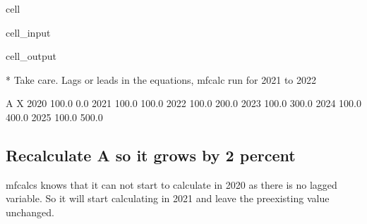 \documentclass[letterpaper,10pt,english]{jupyterBook}
\begin{document}
\begin{sphinxuseclass}{cell}\begin{sphinxVerbatimInput}

\begin{sphinxuseclass}{cell_input}
\begin{sphinxVerbatim}[commandchars=\\\{\}]
 
\end{sphinxVerbatim}

\end{sphinxuseclass}\end{sphinxVerbatimInput}
\begin{sphinxVerbatimOutput}

\begin{sphinxuseclass}{cell_output}
\begin{sphinxVerbatim}[commandchars=\\\{\}]
* Take care. Lags or leads in the equations, mfcalc run for 2021 to 2022
\end{sphinxVerbatim}

\begin{sphinxVerbatim}[commandchars=\\\{\}]
          A      X
2020  100.0    0.0
2021  100.0  100.0
2022  100.0  200.0
2023  100.0  300.0
2024  100.0  400.0
2025  100.0  500.0
\end{sphinxVerbatim}

\end{sphinxuseclass}\end{sphinxVerbatimOutput}

\end{sphinxuseclass}

\subsection{Recalculate A so  it grows by 2 percent}
\label{\detokenize{content/04_PythonEssentials/ExtendingDataFrames:recalculate-a-so-it-grows-by-2-percent}}
\sphinxAtStartPar
mfcalcs knows that it can not start to calculate in 2020 as there is no lagged variable. So it will start calculating in 2021 and leave the pre\sphinxhyphen{}existing value unchanged.
\end{document}
